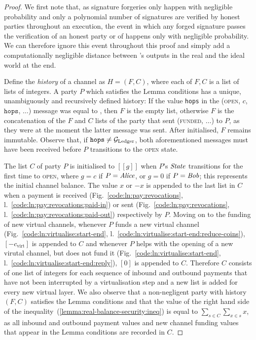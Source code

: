 \begin{proof}
  We first note that, as signature forgeries only happen with negligible
  probability and only a polynomial number of signatures are verified by honest
  parties throughout an execution, the event in which any forged signature
  passes the verification of an honest party or of \ledger happens only with
  negligible probability. We can therefore ignore this event throughout this
  proof and simply add a computationally negligible distance between
  \environment's outputs in the real and the ideal world at the end.

  Define the \emph{history} of a channel as $H = (F, C)$, where each of $F, C$
  is a list of lists of integers. A party $P$ which satisfies the Lemma
  conditions has a unique, unambiguously and recursively defined history: If the
  value \texttt{hops} in the (\textsc{open}, $c$, $\texttt{hops}$, $\dots$)
  message was equal to \ledger, then $F$ is the empty list, otherwise $F$ is the
  concatenation of the $F$ and $C$ lists of the party that sent
  (\textsc{funded}, $\dots$) to $P$, as they were at the moment the latter
  message was sent. After initialised, $F$ remains immutable. Observe that, if
  $\texttt{hops} \neq \mathcal{G}_{\mathrm{Ledger}}$, both aforementioned messages must have been
  received before $P$ transitions to the \textsc{open} state.

  The list $C$ of party $P$ is initialised to $[[g]]$ when $P$'s $\itistate$
  transitions for the first time to \textsc{open}, where $g = c$ if $P =
  \mathit{Alice}$, or $g = 0$ if $P = \mathit{Bob}$; this represents the initial channel
  balance. The value $x$ or $-x$ is appended to the last list in $C$ when a
  payment is received (Fig.~\ref{code:ln:pay:revocations},
  l.~\ref{code:ln:pay:revocations:paid-in}) or sent
  (Fig.~\ref{code:ln:pay:revocations},
  l.~\ref{code:ln:pay:revocations:paid-out}) respectively by $P$. Moving on to
  the funding of new virtual channels, whenever $P$ funds a new virtual channel
  (Fig.~\ref{code:ln:virtualise:start-end},
  l.~\ref{code:ln:virtualise:start-end:reduce-coins}), $[-c_{\mathrm{virt}}]$
  is appended to $C$ and whenever $P$ helps with the opening of a new virutal
  channel, but does not fund it (Fig.~\ref{code:ln:virtualise:start-end},
  l.~\ref{code:ln:virtualise:start-end:reply}), $[0]$ is appended to $C$.
  Therefore $C$ consists of one list of integers for each sequence of inbound
  and outbound payments that have not been interrupted by a virtualisation step
  and a new list is added for every new virtual layer. We also observe that a
  non-negligent party with history $(F, C)$ satisfies the Lemma conditions and
  that the value of the right hand side of the
  inequality~(\ref{lemma:real-balance-security:ineq}) is equal to
  $\sum\limits_{s \in C} \sum\limits_{x \in s} x$, as all inbound and outbound
  payment values and new channel funding values that appear in the Lemma
  conditions are recorded in $C$.


\end{proof}
